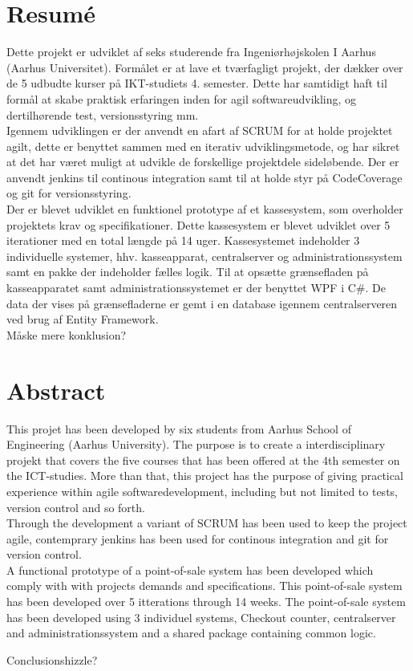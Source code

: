 \section*{Resumé}
Dette projekt er udviklet af seks studerende fra Ingeniørhøjskolen I Aarhus (Aarhus Universitet). Formålet er at lave et tværfagligt projekt, der dækker over de 5 udbudte kurser på IKT-studiets 4. semester. Dette har samtidigt haft til formål at skabe praktisk erfaringen inden for agil softwareudvikling, og dertilhørende test, versionsstyring mm.\\
Igennem udviklingen er der anvendt en afart af SCRUM for at holde projektet agilt, dette er benyttet sammen med en iterativ udviklingsmetode, og har sikret at det har været muligt at udvikle de forskellige projektdele sideløbende. Der er anvendt jenkins til continous integration samt til at holde styr på CodeCoverage og git for versionsstyring. \\
Der er blevet udviklet en funktionel prototype af et kassesystem, som overholder projektets krav og specifikationer. Dette kassesystem er blevet udviklet over 5 iterationer med en total længde på 14 uger. Kassesystemet indeholder 3 individuelle systemer, hhv. kasseapparat, centralserver og administrationssystem samt en pakke der indeholder fælles logik. 
Til at opsætte grænsefladen på kasseapparatet samt administrationssystemet er der benyttet WPF i C#. De data der vises på grænsefladerne er gemt i en database igennem centralserveren ved brug af Entity Framework. \\
Måske mere konklusion?


\section*{Abstract}
This projet has been developed by six students from Aarhus School of Engineering (Aarhus University). The purpose is to create a interdisciplinary projekt that covers the five courses that has been offered at the 4th semester on the ICT-studies. More than that, this project has the purpose of giving practical experience within agile softwaredevelopment, including but not limited to tests, version control and so forth.\\
Through the development a variant of SCRUM has been used to keep the project agile, contemprary jenkins has been used for continous integration and git for version control.\\
A functional prototype of a point-of-sale system has been developed which comply with with projects demands and specifications. This point-of-sale system has been developed over 5 itterations through 14 weeks. The point-of-sale system has been developed using 3 individuel systems, Checkout counter, centralserver and administrationssystem and a shared package containing common logic.

Conclusionshizzle?